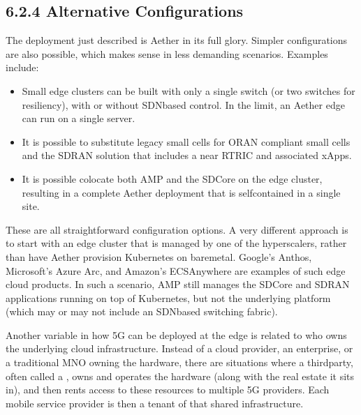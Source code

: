 \documentclass[a4paper,11pt,english]{sphinxmanual}
\begin{document}
\subsection{6.2.4 Alternative Configurations}
\label{\detokenize{cloud:alternative-configurations}}
\sphinxAtStartPar
The deployment just described is Aether in its full glory. Simpler
configurations are also possible, which makes sense in less demanding
scenarios. Examples include:
\begin{itemize}
\item {} 
\sphinxAtStartPar
Small edge clusters can be built with only a single switch (or two
switches for resiliency), with or without SDN\sphinxhyphen{}based control. In the
limit, an Aether edge can run on a single server.

\item {} 
\sphinxAtStartPar
It is possible to substitute legacy small cells for O\sphinxhyphen{}RAN compliant
small cells and the SD\sphinxhyphen{}RAN solution that includes a near RT\sphinxhyphen{}RIC and
associated xApps.

\item {} 
\sphinxAtStartPar
It is possible co\sphinxhyphen{}locate both AMP and the SD\sphinxhyphen{}Core on the edge
cluster, resulting in a complete Aether deployment that is
self\sphinxhyphen{}contained in a single site.

\end{itemize}

\sphinxAtStartPar
These are all straightforward configuration options. A very different
approach is to start with an edge cluster that is managed by one of
the hyperscalers, rather than have Aether provision Kubernetes on
bare\sphinxhyphen{}metal. Google’s Anthos, Microsoft’s Azure Arc, and Amazon’s
ECS\sphinxhyphen{}Anywhere are examples of such edge cloud products. In such a
scenario, AMP still manages the SD\sphinxhyphen{}Core and SD\sphinxhyphen{}RAN applications
running on top of Kubernetes, but not the underlying platform (which
may or may not include an SDN\sphinxhyphen{}based switching fabric).

\sphinxAtStartPar
Another variable in how 5G can be deployed at the edge is related to
who owns the underlying cloud infrastructure. Instead of a cloud
provider, an enterprise, or a traditional MNO owning the hardware,
there are situations where a third\sphinxhyphen{}party, often called a , owns and operates the hardware (along with the real estate it
sits in), and then rents access to these resources to multiple 5G
providers. Each mobile service provider is then a tenant of that
shared infrastructure.
\end{document}
